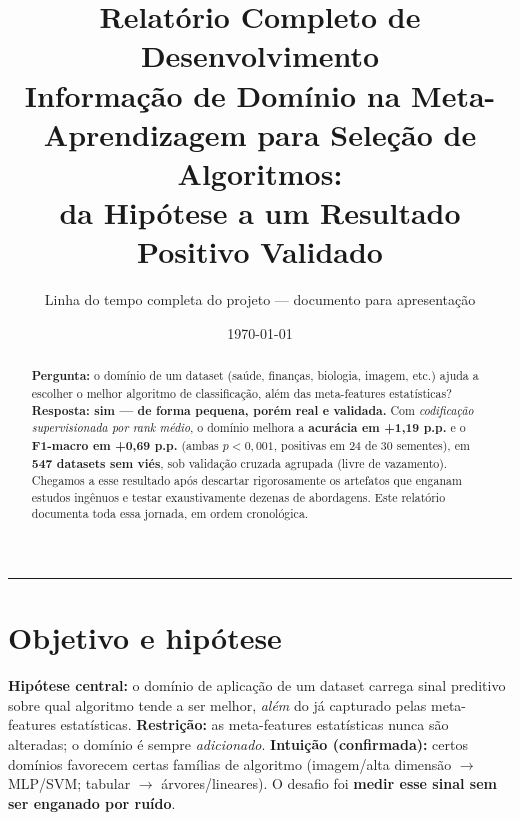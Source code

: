\documentclass[11pt]{article}
\title{\textbf{Relatório Completo de Desenvolvimento}\\[4pt]
\large Informação de Domínio na Meta-Aprendizagem para Seleção de Algoritmos:\\
da Hipótese a um Resultado Positivo Validado}
\author{Linha do tempo completa do projeto --- documento para apresentação}
\date{\today}
\begin{document}
\maketitle

\begin{abstract}
\noindent\textbf{Pergunta:} o domínio de um dataset (saúde, finanças, biologia,
imagem, etc.) ajuda a escolher o melhor algoritmo de classificação, além das
meta-features estatísticas? \textbf{Resposta: sim --- de forma pequena, porém real
e validada.} Com \emph{codificação supervisionada por rank médio}, o domínio
melhora a \textbf{acurácia em +1,19 p.p.} e o \textbf{F1-macro em +0,69 p.p.}
(ambas $p<0,001$, positivas em 24 de 30 sementes), em \textbf{547 datasets sem
viés}, sob validação cruzada agrupada (livre de vazamento). Chegamos a esse
resultado após descartar rigorosamente os artefatos que enganam estudos ingênuos e
testar exaustivamente dezenas de abordagens. Este relatório documenta toda essa
jornada, em ordem cronológica.
\end{abstract}

\tableofcontents
\vspace{4pt}\hrule

\section{Objetivo e hipótese}
\textbf{Hipótese central:} o domínio de aplicação de um dataset carrega sinal
preditivo sobre qual algoritmo tende a ser melhor, \emph{além} do já capturado
pelas meta-features estatísticas. \textbf{Restrição:} as meta-features
estatísticas nunca são alteradas; o domínio é sempre \emph{adicionado}.
\textbf{Intuição (confirmada):} certos domínios favorecem certas famílias de
algoritmo (imagem/alta dimensão $\rightarrow$ MLP/SVM; tabular $\rightarrow$
árvores/lineares). O desafio foi \textbf{medir esse sinal sem ser enganado por
ruído}.
\end{document}
